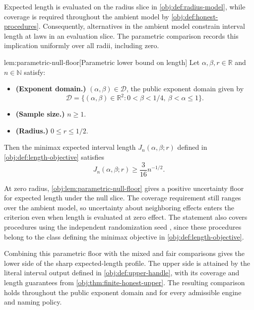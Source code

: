 Expected length is evaluated on the radius slice in \cref{obj:def:radius-model}, while coverage is required throughout the ambient model by \cref{obj:def:honest-procedures}. Consequently, alternatives in the ambient model constrain interval length at laws in an evaluation slice. The parametric comparison records this implication uniformly over all radii, including zero.

\begin{lemmav}{lem:parametric-null-floor}[Parametric lower bound on length]
Let \(\alpha,\beta,r\in\mathbb R\) and \(n\in\mathbb N\) satisfy:
\begin{itemize}
\item \textbf{(Exponent domain.)} \((\alpha,\beta)\in\mathcal D\), the public exponent domain given by
\[
\mathcal D=\{(\alpha,\beta)\in\mathbb R^2:0<\beta<1/4,\ \beta<\alpha\le1\}.
\]
\item \textbf{(Sample size.)} \(n\ge1\).
\item \textbf{(Radius.)} \(0\le r\le1/2\).
\end{itemize}
Then the minimax expected interval length \(J_n(\alpha,\beta;r)\) defined in \cref{obj:def:length-objective} satisfies
\[
J_n(\alpha,\beta;r)\ge \frac{3}{16}n^{-1/2}.
\]
\end{lemmav}

At zero radius, \cref{obj:lem:parametric-null-floor} gives a positive uncertainty floor for expected length under the null slice. The coverage requirement still ranges over the ambient model, so uncertainty about neighboring effects enters the criterion even when length is evaluated at zero effect. The statement also covers procedures using the independent randomization seed , since these procedures belong to the class defining the minimax objective in \cref{obj:def:length-objective}.

Combining this parametric floor with the mixed and fair comparisons gives the lower side of the sharp expected-length profile. The upper side is attained by the literal interval output  defined in \cref{obj:def:upper-handle}, with its coverage and length guarantees from \cref{obj:thm:finite-honest-upper}. The resulting comparison holds throughout the public exponent domain  and for every admissible engine and naming policy.

